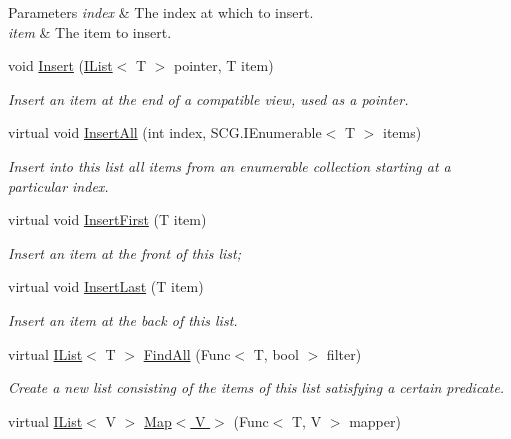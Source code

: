 \begin{DoxyCompactItemize}
\begin{DoxyCompactList}
\begin{DoxyParams}{Parameters}
{\em index} & The index at which to insert.\\
\hline
{\em item} & The item to insert.\\
\hline
\end{DoxyParams}
\end{DoxyCompactList}\item 
void \hyperlink{class_c5_1_1_hashed_array_list_af2232ffdbc3b0970aeebcbda288f22c1}{Insert} (\hyperlink{interface_c5_1_1_i_list}{I\+List}$<$ T $>$ pointer, T item)
\begin{DoxyCompactList}\small\item\em Insert an item at the end of a compatible view, used as a pointer. \end{DoxyCompactList}\item 
virtual void \hyperlink{class_c5_1_1_hashed_array_list_a79d133efc3cafb5a74b265b0c85529f8}{Insert\+All} (int index, S\+C\+G.\+I\+Enumerable$<$ T $>$ items)
\begin{DoxyCompactList}\small\item\em Insert into this list all items from an enumerable collection starting at a particular index. \end{DoxyCompactList}\item 
virtual void \hyperlink{class_c5_1_1_hashed_array_list_a0466cbd0ea303e0ba40e8611dfa3f721}{Insert\+First} (T item)
\begin{DoxyCompactList}\small\item\em Insert an item at the front of this list; \end{DoxyCompactList}\item 
virtual void \hyperlink{class_c5_1_1_hashed_array_list_a616672c94355ca1f07af3a2b2ffe51bb}{Insert\+Last} (T item)
\begin{DoxyCompactList}\small\item\em Insert an item at the back of this list. \end{DoxyCompactList}\item 
virtual \hyperlink{interface_c5_1_1_i_list}{I\+List}$<$ T $>$ \hyperlink{class_c5_1_1_hashed_array_list_a44d89e2d1a233ee63a3e4efdee389585}{Find\+All} (Func$<$ T, bool $>$ filter)
\begin{DoxyCompactList}\small\item\em Create a new list consisting of the items of this list satisfying a certain predicate. \end{DoxyCompactList}\item 
virtual \hyperlink{interface_c5_1_1_i_list}{I\+List}$<$ V $>$ \hyperlink{class_c5_1_1_hashed_array_list_aacf59f051c56a96f62e5de97f1d51b87}{Map$<$ V $>$} (Func$<$ T, V $>$ mapper)

\end{DoxyCompactItemize}

